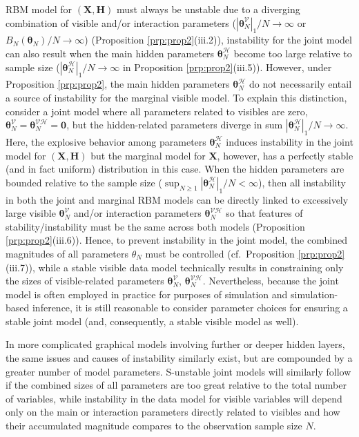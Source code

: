 \documentclass[]{article}
\theoremstyle{definition}
\newcommand{\Gam}{B_{N}(\boldsymbol \theta_N) }
\begin{document}
RBM model for \((\boldsymbol X,\boldsymbol H)\) must always be unstable
due to a diverging combination of visible and/or interaction parameters
(\(|\boldsymbol \theta_N^{\mathcal{V}}|_1/N\to \infty\) or
\(\Gam/N\to \infty\)) (Proposition \ref{prp:prop2}(iii.2)), instability
for the joint model can also result when the main hidden parameters
\(\boldsymbol \theta_N^{\mathcal{H}}\) become too large relative to
sample size (\(|\boldsymbol \theta_N^{\mathcal{H}}|_1/N\to \infty\) in
Proposition \ref{prp:prop2}(iii.5)). However, under Proposition
\ref{prp:prop2}, the main hidden parameters
\(\boldsymbol \theta_N^{\mathcal{H}}\) do not necessarily entail a
source of instability for the marginal visible model. To explain this
distinction, consider a joint model where all parameters related to
visibles are zero,
\(\boldsymbol \theta_N^{\mathcal{V}}= \boldsymbol \theta_N^{\mathcal{VH}}=\boldsymbol 0\),
but the hidden-related parameters diverge in sum
\(|\boldsymbol \theta_N^{\mathcal{H}}|_1/N\to \infty\). Here, the
explosive behavior among parameters
\(\boldsymbol \theta_N^{\mathcal{H}}\) induces instability in the joint
model for \((\boldsymbol X, \boldsymbol H)\) but the marginal model for
\(\boldsymbol X\), however, has a perfectly stable (and in fact uniform)
distribution in this case. When the hidden parameters are bounded
relative to the sample size
(\(\sup_{N\geq 1} |\boldsymbol \theta_N^{\mathcal{H}}|_1/N<\infty\)),
then all instability in both the joint and marginal RBM models can be
directly linked to excessively large visible
\(\boldsymbol \theta_N^{\mathcal{V}}\) and/or interaction parameters
\(\boldsymbol \theta_N^{\mathcal{VH}}\) so that features of
stability/instability must be the same across both models (Proposition
\ref{prp:prop2}(iii.6)). Hence, to prevent instability in the joint
model, the combined magnitudes of all parameters \(\theta_N\) must be
controlled (cf.~Proposition \ref{prp:prop2}(iii.7)), while a stable
visible data model technically results in constraining only the sizes of
visible-related parameters \(\boldsymbol \theta_N^{\mathcal{V}}\),
\(\boldsymbol \theta_N^{\mathcal{VH}}\). Nevertheless, because the joint
model is often employed in practice for purposes of simulation and
simulation-based inference, it is still reasonable to consider parameter
choices for ensuring a stable joint model (and, consequently, a stable
visible model as well).

In more complicated graphical models involving further or deeper hidden
layers, the same issues and causes of instability similarly exist, but
are compounded by a greater number of model parameters. S-unstable joint
models will similarly follow if the combined sizes of all parameters are
too great relative to the total number of variables, while instability
in the data model for visible variables will depend only on the main or
interaction parameters directly related to visibles and how their
accumulated magnitude compares to the observation sample size \(N\).
\end{document}
